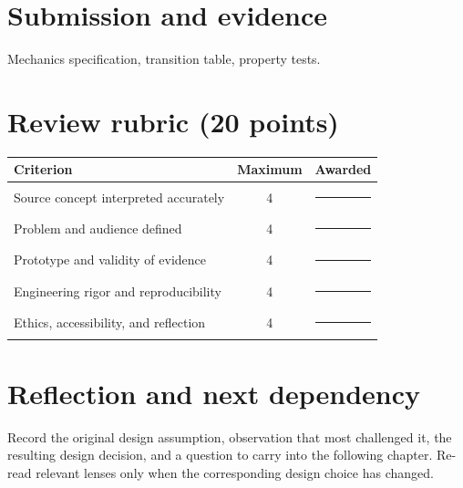 \documentclass[11pt]{article}
\begin{document}
\section{Submission and evidence}
Mechanics specification, transition table, property tests.


\section{Review rubric (20 points)}
\begin{tabularx}{\linewidth}{@{}Xcc@{}}\toprule
Criterion & Maximum & Awarded \\ \midrule
Source concept interpreted accurately & 4 & \rule{0.45in}{0.4pt}\\
Problem and audience defined & 4 & \rule{0.45in}{0.4pt}\\
Prototype and validity of evidence & 4 & \rule{0.45in}{0.4pt}\\
Engineering rigor and reproducibility & 4 & \rule{0.45in}{0.4pt}\\
Ethics, accessibility, and reflection & 4 & \rule{0.45in}{0.4pt}\\\bottomrule
\end{tabularx}

\section{Reflection and next dependency}
Record the original design assumption, observation that most challenged it, the resulting design decision, and a question to carry into the following chapter. Re-read relevant lenses only when the corresponding design choice has changed.
\end{document}
